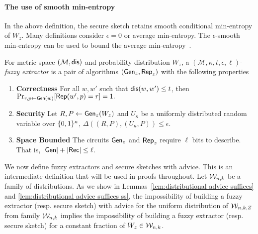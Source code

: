 \paragraph{The use of smooth min-entropy} In the above definition, the secure sketch retains smooth conditional min-entropy of $W_z$.  Many definitions consider $\epsilon=0$ or average min-entropy.  The $\epsilon$-smooth min-entropy can be used to bound the average min-entropy~\cite[Appendix B]{dodis2008fuzzy}. 

\begin{definition}
For metric space $(\mathcal{M}, \mathsf{dis})$ and probability distribution $W_z$, a $(\mathcal{M}, \kappa, t, \epsilon, \ell)$-\emph{fuzzy extractor} is a pair of algorithms $({\mathsf{Gen}}_z, {\mathsf{Rep}}_z)$ with the following properties 
\begin{enumerate} 
\itemsep0em
\item \textbf{Correctness} For all $w, w'$ such that $\mathsf{dis}(w, w')\le t$, then 
$\Pr_{r, p \leftarrow {\ensuremath{\mathsf{Gen}}}(w)}[{\mathsf{Rep}}(w', p) = r]=1.$ 
\item \textbf{Security} Let $R, P \leftarrow {\ensuremath{\mathsf{Gen}}}_z(W_z)$ and $U_\kappa$ be a uniformly distributed random variable over $\{0, 1\}^\kappa$, $\Delta((R, P), (U_\kappa, P))\le \epsilon.$
\item  \textbf{Space Bounded} The circuits ${\mathsf{Gen}}_z$ and ${\mathsf{Rep}}_z$ require $\ell$ bits to describe.  That is, $|{\mathsf{Gen}}| +|{\mathsf{Rec}}|\le \ell$.
\end{enumerate}
\label{def:fe}
\end{definition}

\noindent
We now define fuzzy extractors and secure sketches with advice.  This is an intermediate definition that will be used in proofs throughout.  Let $\mathcal{W}_{n,k}$ be a family of distributions. As we show in Lemmas~\ref{lem:distributional advice suffices} and \ref{lem:distributional advice suffices ss}, the impossibility of building a fuzzy extractor (resp. secure sketch) with advice for the uniform distribution of $\mathcal{W}_{n,k, Z}$ from family $\mathcal{W}_{n,k}$ implies the impossibility of building a fuzzy extractor (resp. secure sketch) for a constant fraction of $W_z\in\mathcal{W}_{n,k}$.

